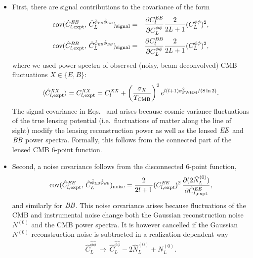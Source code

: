 \begin{itemize}
\item First, there are signal contributions to the covariance of the form
\begin{eqnarray}
  \label{eq:covEEphiEBphiEB}
  \text{cov}(\hat C^{\mathit{EE}}_{l,\text{expt}},\, 
  \hat{C}^{\hat\phi_{\mathit{EB}}\hat\phi_{\mathit{EB}}}_{L})_\mathrm{signal}
&=&
\frac{\partial C^{\mathit{EE}}_l}{\partial C^{\phi\phi}_{L}}
\frac{2}{2L+1} (C^{\phi\phi}_{L})^2,\\
  \label{eq:covBBphiEBphiEB}
  \text{cov}(\hat C^{\mathit{BB}}_{l,\text{expt}},\, 
  \hat{C}^{\hat\phi_{\mathit{EB}}\hat\phi_{\mathit{EB}}}_{L})_\mathrm{signal}
&=&
\frac{\partial C^{\mathit{BB}}_l}{\partial C^{\phi\phi}_{L}}
\frac{2}{2L+1} (C^{\phi\phi}_{L})^2,
\end{eqnarray}
where we used power spectra of observed (noisy, beam-deconvolved) CMB fluctuations $X\in \{E,B\}$:
\begin{equation}
  \label{eq:CXXexptExpectation}
  \langle\hat C^{\mathit{XX}}_{l,\text{expt}}\rangle = 
 C^{\mathit{XX}}_{l,\text{expt}} = C^{\mathit{XX}}_{l}
+ \left(\frac{\sigma_X}{T_\mathrm{CMB}}\right)^2 
  e^{l(l+1)\sigma^2_{\mathrm{FWHM}}/(8\ln 2)}.
\end{equation}
The signal covariance in Eqs.~ and  arises because cosmic variance fluctuations of the true lensing potential (i.e.~fluctuations of matter along the line of sight) modify the lensing reconstruction power as well as the lensed $\mathit{EE}$ and $\mathit{BB}$ power spectra.  Formally, this follows from the connected part of the lensed CMB 6-point function.
\item Second, a noise covariance follows from the disconnected 6-point function,
\begin{align}
  \label{eq:2}
\mathrm{cov}(\hat C^{\mathit{EE}}_{l,\mathrm{expt}}, \,\hat C^{\hat\phi_{\mathit{EB}}\hat\phi_{\mathit{EB}}}_L)_\mathrm{noise}
=
\frac{2}{2l+1}(C^{\mathit{EE}}_{l,\mathrm{expt}})^2 \, \frac{\partial(2\hat N^{(0)}_L)}{\partial \hat C^{\mathit{EE}}_{l,\mathrm{expt}}},
\end{align}
and similarly for $\mathit{BB}$.
This noise covariance arises because fluctuations of the CMB and instrumental noise change both the Gaussian reconstruction noise $N^{(0)}$ and the CMB power spectra.  It is however cancelled if the Gaussian $N^{(0)}$ reconstruction noise is subtracted in a realization-dependent way \cite{cora0812,duncan1008,Namikawa1209,marcel1308}
\begin{align}
  \label{eq:RDN0procedure}
  \hat C^{\hat\phi\hat\phi}_L \,\rightarrow \,
\hat C^{\hat\phi\hat\phi}_L - 2 \hat N^{(0)}_L + N^{(0)}_{L}.
\end{align}

\end{itemize}
